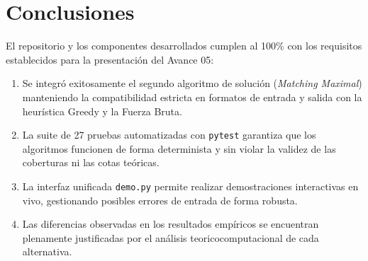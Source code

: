 \documentclass[11pt,a4paper]{article}
\begin{document}
\section{Conclusiones}
El repositorio y los componentes desarrollados cumplen al 100\% con los requisitos establecidos para la presentación del Avance 05:
\begin{enumerate}[leftmargin=*]
    \item Se integró exitosamente el segundo algoritmo de solución (\textit{Matching Maximal}) manteniendo la compatibilidad estricta en formatos de entrada y salida con la heurística Greedy y la Fuerza Bruta.
    \item La suite de 27 pruebas automatizadas con \texttt{pytest} garantiza que los algoritmos funcionen de forma determinista y sin violar la validez de las coberturas ni las cotas teóricas.
    \item La interfaz unificada \texttt{demo.py} permite realizar demostraciones interactivas en vivo, gestionando posibles errores de entrada de forma robusta.
    \item Las diferencias observadas en los resultados empíricos se encuentran plenamente justificadas por el análisis teoricocomputacional de cada alternativa.
\end{enumerate}
\end{document}
